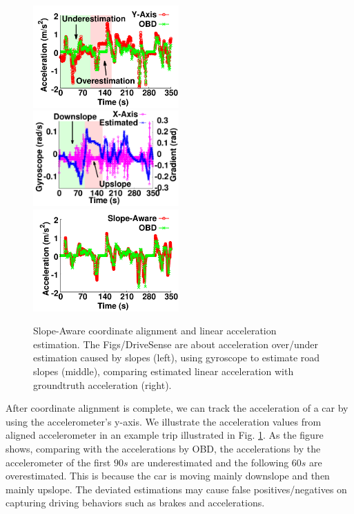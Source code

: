 \begin{figure}[t]
\begin{center}
\includegraphics[width=2.2in,angle=0]{Figs/DriveSense/slopeaware/accspeed.pdf}
\hspace{-0.0cm}
\includegraphics[width=2.2in,angle=0]{Figs/DriveSense/slopeaware/gyrocompare.pdf}
\hspace{-0.0cm}
\includegraphics[width=2.2in,angle=0]{Figs/DriveSense/slopeaware/acccompare.pdf}
\hspace{-0.0cm}
\vspace{-0.2cm}
\caption{Slope-Aware coordinate alignment and linear acceleration estimation. 
The Figs/DriveSense are about acceleration over/under estimation caused by slopes (left), 
using gyroscope to estimate road slopes (middle), 
comparing estimated linear acceleration with groundtruth acceleration (right).}
\vspace{-0.2cm}
\label{linear_acceleration}
\end{center}
\end{figure}


After coordinate alignment is complete, 
we can track the acceleration of a car by using the accelerometer's y-axis. 
We illustrate the acceleration values from aligned accelerometer 
in an example trip illustrated in Fig. \ref{linear_acceleration}. 
As the figure shows, comparing with the accelerations by OBD,   
the accelerations by the accelerometer of the first $90s$ 
are underestimated and the following $60s$ are overestimated.
This is because the car is moving mainly downslope and then mainly upslope. 
The deviated estimations may cause false positives/negatives on 
capturing driving behaviors such as brakes and accelerations.

